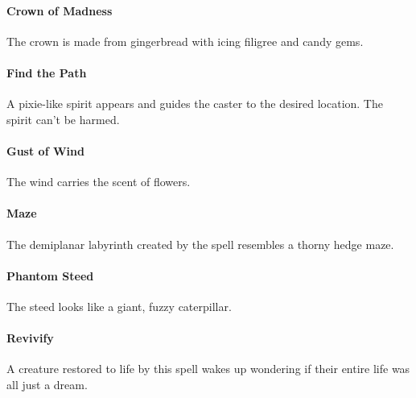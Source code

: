 \documentclass[10pt,a4paper,twoside,twocolumn,openany,nodeprecatedcode,bg=print]{dndbook}
\begin{document}
\paragraph{Crown of Madness}
The crown is made from gingerbread with icing filigree and candy gems.
\paragraph{Find the Path}
A pixie-like spirit appears and guides the caster to the desired location. The spirit can't be harmed.
\paragraph{Gust of Wind}
The wind carries the scent of flowers.
\paragraph{Maze}
The demiplanar labyrinth created by the spell resembles a thorny hedge maze.
\paragraph{Phantom Steed}
The steed looks like a giant, fuzzy caterpillar.
\paragraph{Revivify}
A creature restored to life by this spell wakes up wondering if their entire life was all just a dream.
\end{document}
